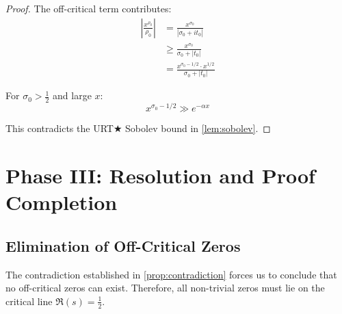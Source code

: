 \documentclass[11pt,a4paper]{article}
\theoremstyle{plain}
\theoremstyle{definition}
\begin{document}
\begin{proof}
The off-critical term contributes:
\begin{align}
\left|\frac{x^{\rho_0}}{\rho_0}\right| &= \frac{x^{\sigma_0}}{|\sigma_0 + it_0|} \\
&\geq \frac{x^{\sigma_0}}{\sigma_0 + |t_0|} \\
&= \frac{x^{\sigma_0-1/2} \cdot x^{1/2}}{\sigma_0 + |t_0|}
\end{align}

For $\sigma_0 > \frac{1}{2}$ and large $x$:
\begin{equation}
x^{\sigma_0-1/2} \gg e^{-\alpha x}
\end{equation}

This contradicts the URT★ Sobolev bound in \cref{lem:sobolev}.
\end{proof}

\section{Phase III: Resolution and Proof Completion}

\subsection{Elimination of Off-Critical Zeros}

The contradiction established in \cref{prop:contradiction} forces us to conclude that no off-critical zeros can exist. Therefore, all non-trivial zeros must lie on the critical line $\Re(s) = \frac{1}{2}$.
\end{document}
